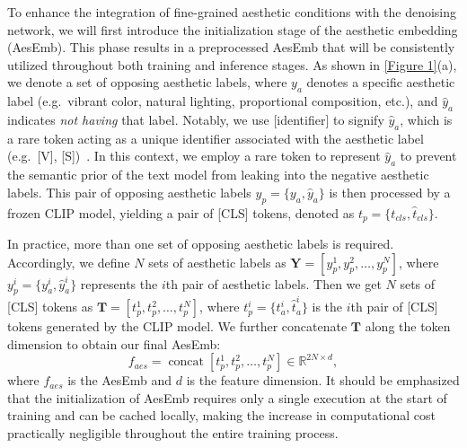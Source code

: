 To enhance the integration of fine-grained aesthetic conditions with the denoising network, we will first introduce the initialization stage of the aesthetic embedding (AesEmb). This phase results in a preprocessed AesEmb that will be consistently utilized throughout both training and inference stages. As shown in \cref{Figure 1}(a), we denote a set of opposing aesthetic labels, where $y_{a}$ denotes a specific aesthetic label (e.g.\ vibrant color, natural lighting, proportional composition, etc.), and $\hat{y}_{a}$ indicates \textit{not having} that label. Notably, we use [identifier] to signify $\hat{y}_{a}$, which is a rare token acting as a unique identifier associated with the aesthetic label (e.g.\ [V], [S])~\cite{ruiz2023dreambooth}. In this context, we employ a rare token to represent $\hat{y}_{a}$ to prevent the semantic prior of the text model from leaking into the negative aesthetic labels. This pair of opposing aesthetic labels $y_p=\{y_{a}, \hat{y}_{a}\}$ is then processed by a frozen CLIP model, yielding a pair of [CLS] tokens, denoted as $t_p=\{t_{cls}, \hat{t}_{cls}\}$.

In practice, more than one set of opposing aesthetic labels is required. Accordingly, we define $N$ sets of aesthetic labels as $\textbf{Y}=\left[y_{p}^{1}, y_{p}^{2}, \ldots, y_{p}^{N}\right]$, where $y_p^i=\{y_{a}^i, \hat{y}_{a}^i\}$ represents the $i$th pair of aesthetic labels. Then we get $N$ sets of [CLS] tokens as $\textbf{T}=\left[t_{p}^{1}, t_{p}^{2}, \ldots, t_{p}^{N}\right]$, where $t_p^i=\{t_{a}^i, \hat{t}_{a}^i\}$ is the $i$th pair of [CLS] tokens generated by the CLIP model. We further concatenate $\textbf{T}$ along the token dimension to obtain our final AesEmb:
\begin{equation}
f_{aes}=\operatorname{concat}\left[t_{p}^{1}, t_{p}^{2}, \ldots, t_{p}^{N}\right] \in \mathbb{R}^{2N \times d},\label{eq5}
\end{equation}
where $f_{aes}$ is the AesEmb and $d$ is the feature dimension. 
It should be emphasized that the initialization of AesEmb requires only a single execution at the start of training and can be cached locally, making the increase in computational cost practically negligible throughout the entire training process.

